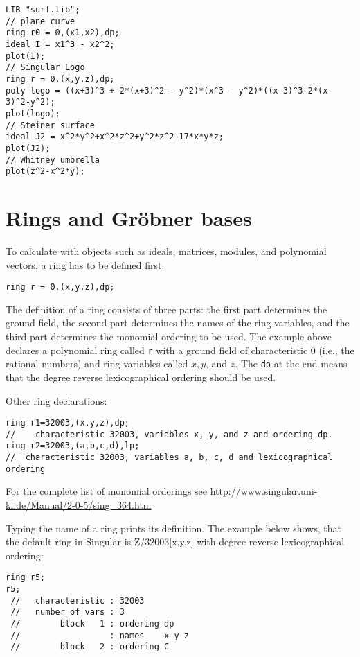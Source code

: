 \documentclass[12pt]{amsart}
\begin{document}
\begin{verbatim}
LIB "surf.lib";
// plane curve
ring r0 = 0,(x1,x2),dp;
ideal I = x1^3 - x2^2;
plot(I); 
// Singular Logo 
ring r = 0,(x,y,z),dp;
poly logo = ((x+3)^3 + 2*(x+3)^2 - y^2)*(x^3 - y^2)*((x-3)^3-2*(x-3)^2-y^2);
plot(logo);
// Steiner surface
ideal J2 = x^2*y^2+x^2*z^2+y^2*z^2-17*x*y*z;
plot(J2);
// Whitney umbrella
plot(z^2-x^2*y);
\end{verbatim}

\section{Rings and Gr\"obner bases}

To calculate with objects such as ideals, matrices, modules, and polynomial vectors, a ring has to be defined first.

\begin{verbatim}
ring r = 0,(x,y,z),dp;
\end{verbatim}

The definition of a ring consists of three parts: the first part determines the ground field, 
the second part determines the names of the ring variables, and the third part determines the monomial ordering to be used. 
The example above declares a polynomial ring called \texttt{r} with a ground field of characteristic 0 
(i.e., the rational numbers) and ring variables called $x, y$, and $z$. The \texttt{dp} at the end means that the 
degree reverse lexicographical ordering should be used.

Other ring declarations:

\begin{verbatim}
ring r1=32003,(x,y,z),dp;
//    characteristic 32003, variables x, y, and z and ordering dp. 
ring r2=32003,(a,b,c,d),lp;
//  characteristic 32003, variables a, b, c, d and lexicographical ordering
\end{verbatim}

For the complete list of monomial orderings see \url{http://www.singular.uni-kl.de/Manual/2-0-5/sing_364.htm}

Typing the name of a ring prints its definition. The example below shows, that the default ring in 
Singular is Z/32003[x,y,z] with degree reverse lexicographical ordering:

\begin{verbatim}
ring r5;
r5;
 //   characteristic : 32003
 //   number of vars : 3
 //        block   1 : ordering dp
 //                  : names    x y z 
 //        block   2 : ordering C
\end{verbatim}
\end{document}
